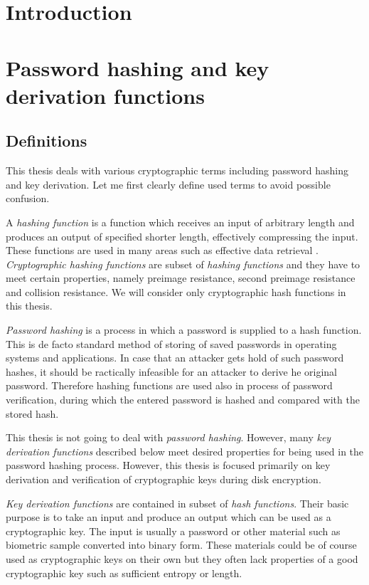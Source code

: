 \documentclass[nolof]{fithesis3}
\begin{document}
\chapter{Introduction}

\chapter{Password hashing and key derivation functions}

\section{Definitions}
This thesis deals with various cryptographic terms including password hashing and key derivation. Let me first clearly define used terms to avoid possible confusion.

A \emph{hashing function} is a function which receives an input of arbitrary length and produces an output of specified shorter length, effectively compressing the input. These functions are used in many areas such as effective data retrieval \parencite{itmc14}. \emph{Cryptographic hashing functions} are subset of \emph{hashing functions} and they have to meet certain properties, namely preimage resistance, second preimage resistance and collision resistance. We will consider only cryptographic hash functions in this thesis.

\emph{Password hashing} is a process in which a password is supplied to a hash function. This is de facto standard method of storing of saved passwords in operating systems and applications. In case that an attacker gets hold of such password hashes, it should be ractically infeasible for an attacker to derive he original password. Therefore hashing functions are used also in process of password verification, during which the entered password is hashed and compared with the stored hash.

This thesis is not going to deal with \emph{password hashing}. However, many \emph{key derivation functions} described below meet desired properties for being used in the password hashing process. However, this thesis is focused primarily on key derivation and verification of cryptographic keys during disk encryption.

\emph{Key derivation functions} are contained in subset of \emph{hash functions}. Their basic purpose is to take an input and produce an output which can be used as a cryptographic key. The input is usually a password or other material such as biometric sample converted into binary form. These materials could be of course used as cryptographic keys on their own but they often lack properties of a good cryptographic key such as sufficient entropy or length. 
\end{document}
